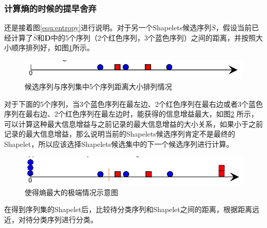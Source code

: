 \subsubsection{计算熵的时候的提早舍弃}
还是接着图\ref{equ:entropy}进行说明。对于另一个Shapelets候选序列$\bar{S}$，假设当前已经计算了$\bar{S}$和$\bm{D}$中的5个序列（2个红色序列，3个蓝色序列）之间的距离，并按照大小顺序排列好，如图\ref{fig:16}所示。
\begin{figure}[h]
  \centering
  \includegraphics[width=0.6\linewidth]{./figure/Entropy2.PNG}
  \caption{候选序列与序列集中5个序列距离大小排列情况}\label{fig:16}
\end{figure}

对于下面的5个序列，当3个蓝色序列在最左边、2个红色序列在最右边或者3个蓝色序列在最右边、2个红色序列在最左边时，能获得的信息增益最大，如图\ref{fig:17} 所示，可以计算这种最大信息增益与之前记录的最大信息增益的大小关系，如果小于之前记录的最大信息增益，那么说明当前的Shapelets候选序列肯定不是最终的Shapelet，所以应该选择Shapelets候选集中的下一个候选序列进行计算。

\begin{figure}[h]
  \centering
  \includegraphics[width=0.6\linewidth]{./figure/Entropy3.PNG}
  \caption{使得熵最大的极端情况示意图}\label{fig:17}
\end{figure}

在得到序列集的Shapelet后，比较待分类序列和Shapelet之间的距离，根据距离远近，对待分类序列进行分类。